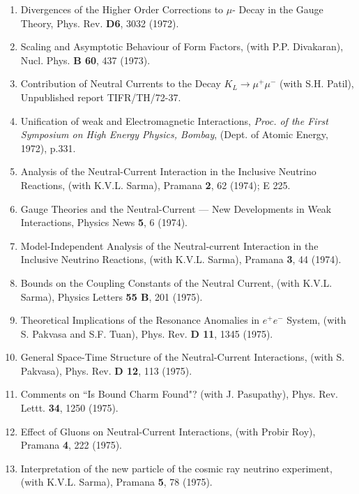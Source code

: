 \begin{enumerate}
\item Divergences of the Higher Order Corrections to $\mu$- Decay in the
Gauge Theory, Phys. Rev. {\bf D6}, 3032 (1972).

\item Scaling and Asymptotic Behaviour of Form Factors, (with P.P.
Divakaran), Nucl. Phys. {\bf B 60}, 437 (1973).

\item Contribution of Neutral Currents to the Decay $K_L \rightarrow
\mu^+ \mu^-$ (with S.H. Patil), Unpublished report TIFR/TH/72-37.

\item Unification of weak and Electromagnetic Interactions, {\it Proc. of the
First Symposium on High Energy Physics, Bombay}, (Dept. of Atomic
Energy, 1972), p.331.

\item Analysis of the Neutral-Current Interaction in the Inclusive
Neutrino Reactions, (with K.V.L. Sarma), Pramana {\bf 2}, 62 (1974); E 225.

\item Gauge Theories and the Neutral-Current --- New Developments in Weak
Interactions,  Physics News {\bf 5}, 6 (1974).

\item Model-Independent Analysis of the Neutral-current Interaction in
the Inclusive Neutrino Reactions, (with K.V.L. Sarma), Pramana {\bf 3},
44 (1974).

\item Bounds on the Coupling Constants of the Neutral Current, (with
K.V.L. Sarma), Physics Letters {\bf 55 B}, 201 (1975).

\item Theoretical Implications of the Resonance Anomalies in $e^+ e^-$
System, (with S. Pakvasa and S.F. Tuan), Phys. Rev. {\bf D 11}, 1345 (1975).

\item General Space-Time Structure of the Neutral-Current Interactions,
(with S. Pakvasa), Phys. Rev. {\bf D 12}, 113 (1975).

\item Comments on ``Is Bound Charm Found"? (with J. Pasupathy),
Phys. Rev. Lettt. {\bf 34}, 1250 (1975).

\item Effect of Gluons on Neutral-Current Interactions, (with Probir
Roy), Pramana {\bf 4}, 222 (1975).

\item Interpretation of the new particle of the cosmic ray neutrino
experiment, (with K.V.L. Sarma), Pramana {\bf 5}, 78 (1975).


\end{enumerate}
